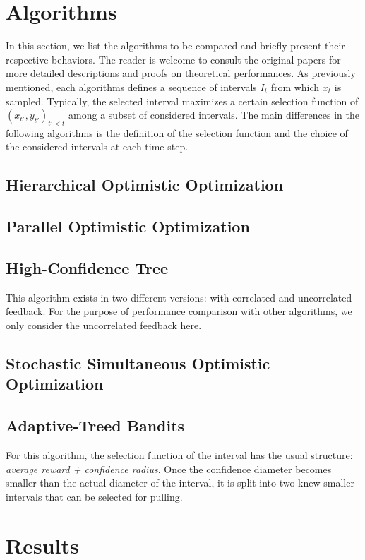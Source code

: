\documentclass[a4paper,10pt]{article}
\begin{document}
\section{Algorithms}
\label{algo}
In this section, we list the algorithms to be compared and briefly present their respective behaviors. The reader is welcome to consult the original papers for more detailed descriptions and proofs on theoretical performances. As previously mentioned, each algorithms defines a sequence of intervals $I_t$ from which $x_t$ is sampled. Typically, the selected interval maximizes a certain selection function of $(x_{t'},y_{t'})_{t'< t}$ among a subset of considered intervals. The main differences in the following algorithms is the definition of the selection function and the choice of the considered intervals at each time step.

\subsection{Hierarchical Optimistic Optimization}

\subsection{Parallel Optimistic Optimization}

\subsection{High-Confidence Tree}
This algorithm exists in two different versions: with correlated and uncorrelated feedback. For the purpose of performance comparison with other algorithms, we only consider the uncorrelated feedback here.

\subsection{Stochastic Simultaneous Optimistic Optimization}

\subsection{Adaptive-Treed Bandits}
For this algorithm, the selection function of the interval has the usual structure: \textit{average reward + confidence radius}. Once the confidence diameter becomes smaller than the actual diameter of the interval, it is split into two knew smaller intervals that can be selected for pulling.

\section{Results}
\end{document}
